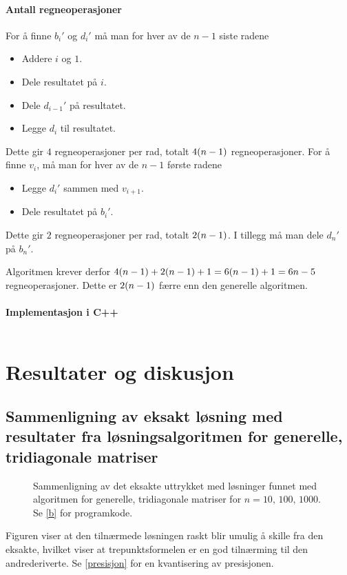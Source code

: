 \documentclass[12pt,norsk,a4paper]{report}
\begin{document}
\paragraph{Antall regneoperasjoner}
For å finne \(b_i'\) og \(d_i'\) må man for hver av de \(n-1\) siste radene
\begin{itemize}
\item Addere \(i\) og \(1\).
\item Dele resultatet på \(i\).
\item Dele \(d_{i-1}'\) på resultatet.
\item Legge \(d_i\) til resultatet.
\end{itemize}
Dette gir \(4\) regneoperasjoner per rad, totalt \(4\qty(n-1)\) regneoperasjoner. For å finne \(v_i\), må man for hver av de \(n-1\) første radene
\begin{itemize}
\item Legge \(d_i'\) sammen med \(v_{i+1}\).
\item Dele resultatet på \(b_i'\).
\end{itemize}
Dette gir \(2\) regneoperasjoner per rad, totalt \(2\qty(n-1)\). I tillegg må man dele \(d_n'\) på \(b_n'\).

Algoritmen krever derfor \(4\qty(n-1)+2\qty(n-1)+1=6\qty(n-1)+1=6n-5\) regneoperasjoner. Dette er \(2\qty(n-1)\) færre enn den generelle algoritmen.

\paragraph{Implementasjon i C++}
\inputminted{cpp}{spesiell.cpp}




\section{Resultater og diskusjon}

\subsection{Sammenligning av eksakt løsning med resultater fra løsningsalgoritmen for generelle, tridiagonale matriser}

\begin{figure}[H]
\centering

\caption{Sammenligning av det eksakte uttrykket med løsninger funnet med algoritmen for generelle, tridiagonale matriser for \(n=10,\,100,\,1000\). Se \vref{b} for programkode.}
\label{geneksakt}
\end{figure}
Figuren viser at den tilnærmede løsningen raskt blir umulig å skille fra den eksakte, hvilket viser at trepunktsformelen er en god tilnærming til den andrederiverte. Se \vref{presisjon} for en kvantisering av presisjonen.
\end{document}
